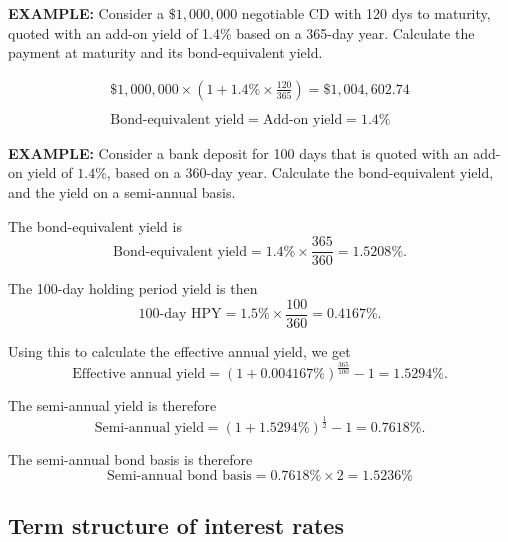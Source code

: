 \documentclass[../notes_compiled.tex]{subfiles}
\begin{document}
\begin{itemize}
{\color{RedViolet}
\item[] \textbf{EXAMPLE:} Consider a $\$1,000,000$ negotiable CD with 120 dys to maturity, quoted with an add-on yield of 1.4\% based on a 365-day year. Calculate the payment at maturity and its bond-equivalent yield.
}
{\color{RoyalBlue}
\begin{gather*}
\$1,000,000\times \left( 1+1.4\%\times\frac{120}{365} \right) = \$1,004,602.74 \\ \\
\text{Bond-equivalent yield} = \text{Add-on yield} = 1.4\%
\end{gather*}
}

{\color{RedViolet}
\item[] \textbf{EXAMPLE:} Consider a bank deposit for 100 days that is quoted with an add-on yield of $1.4\%$, based on a 360-day year. Calculate the bond-equivalent yield, and the yield on a semi-annual basis.
}
{\color{RoyalBlue}
The bond-equivalent yield is
\begin{equation*}
\text{Bond-equivalent yield} = 1.4\%\times\frac{365}{360} = 1.5208\%.
\end{equation*}

The 100-day holding period yield is then
\begin{equation*}
\text{100-day HPY} = 1.5\%\times\frac{100}{360} = 0.4167\%.
\end{equation*}

Using this to calculate the effective annual yield, we get
\begin{equation*}
\text{Effective annual yield}=(1+0.004167\%)^{\frac{365}{100}}-1=1.5294\%.
\end{equation*}

The semi-annual yield is therefore
\begin{equation*}
\text{Semi-annual yield} = (1+1.5294\%)^{\frac{1}{2}}-1=0.7618\%.
\end{equation*}

The semi-annual bond basis is therefore
\begin{equation*}
\text{Semi-annual bond basis} = 0.7618\% \times 2 = 1.5236\%
\end{equation*}
}
\end{itemize}


\subsection{Term structure of interest rates}
\end{document}
